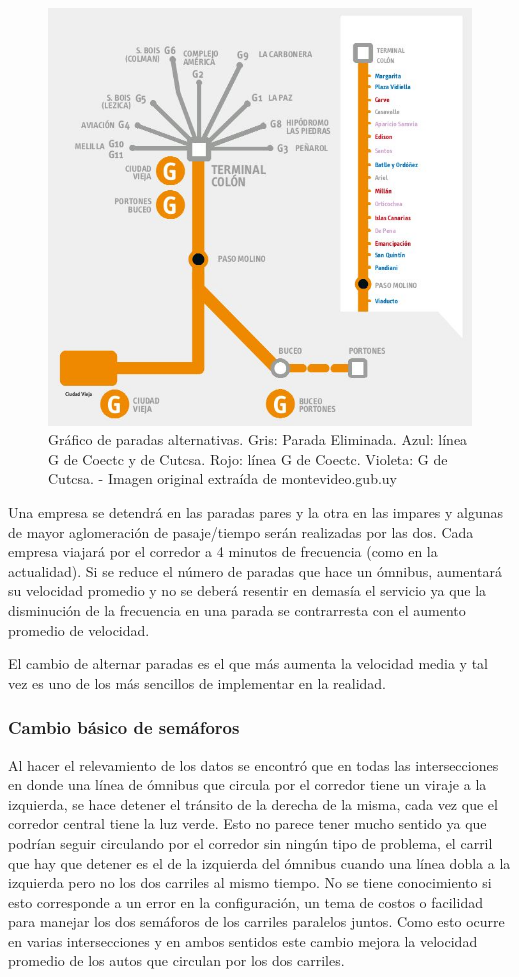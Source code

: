 \begin{figure}[H]
	\centering
	\includegraphics[width=0.9\linewidth]{Figures/paradas_alternativas}
	\caption{Gráfico de paradas alternativas. Gris: Parada Eliminada. Azul: línea G de Coectc y de Cutcsa. Rojo: línea G de Coectc. Violeta: G de Cutcsa. - Imagen original extraída de montevideo.gub.uy}
	\label{fig:paradas_alternadas}
\end{figure}

Una empresa se detendrá en las paradas pares y la otra en las impares y algunas de mayor aglomeración de pasaje/tiempo serán realizadas por las dos. Cada empresa viajará por el corredor a 4 minutos de frecuencia (como en la actualidad). Si se reduce el número de paradas que hace un ómnibus, aumentará su velocidad promedio y no se deberá resentir en demasía el servicio ya que la disminución de la frecuencia en una parada se contrarresta con el aumento promedio de velocidad.

El cambio de alternar paradas es el que más aumenta la velocidad media y tal vez es uno de los más sencillos de implementar en la realidad.



\subsubsection{Cambio básico de semáforos}
Al hacer el relevamiento de los datos se encontró que en todas las intersecciones en donde una línea de ómnibus que circula por el corredor tiene un viraje a la izquierda, se hace detener el tránsito de la derecha de la misma, cada vez que el corredor central tiene la luz verde. Esto no parece tener mucho sentido ya que podrían seguir circulando por el corredor sin ningún tipo de problema, el carril que hay que detener es el de la izquierda del ómnibus cuando una línea dobla a la izquierda pero no los dos carriles al mismo tiempo. No se tiene conocimiento si esto corresponde a un error en la configuración, un tema de costos o facilidad para manejar los dos semáforos de los carriles paralelos juntos. Como esto ocurre en varias intersecciones y en ambos sentidos este cambio mejora la velocidad promedio de los autos que circulan por los dos carriles.

